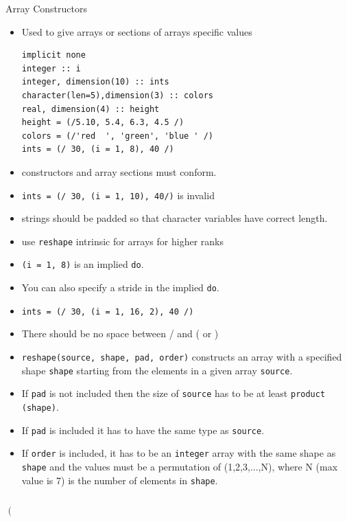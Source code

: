 \documentclass[c,mathserif,compress,xcolor=svgnames]{beamer}
\newcommand{\lstfortran}[1]{\lstinline[language={[90]Fortran},basicstyle=\footnotesize\ttfamily]|#1|}
\begin{document}
\begin{frame}{Array Constructors}
  \begin{itemize}
    \item Used to give arrays or sections of arrays specific values
      \begin{lstlisting}[language={[90]Fortran},basicstyle=\fontsize{6}{7}\selectfont\ttfamily]
implicit none
integer :: i
integer, dimension(10) :: ints
character(len=5),dimension(3) :: colors
real, dimension(4) :: height
height = (/5.10, 5.4, 6.3, 4.5 /)
colors = (/'red  ', 'green', 'blue ' /)
ints = (/ 30, (i = 1, 8), 40 /)
      \end{lstlisting}
    \item constructors and array sections must conform.
    \item[] \lstfortran{ints = (/ 30, (i = 1, 10), 40/)} is invalid
    \item strings should be padded so that character variables have correct length.
    \item use \lstfortran{reshape} intrinsic for arrays for higher ranks
    \item \lstfortran{(i = 1, 8)} is an implied \lstfortran{do}.
    \item You can also specify a stride in the implied \lstfortran{do}.
    \item[] \lstfortran{ints = (/ 30, (i = 1, 16, 2), 40 /)}
    \item {\color{red}There should be no space between / and ( or )}
      \framebreak
    \item \lstfortran{reshape(source, shape, pad, order)} constructs an array with a specified shape \lstfortran{shape} starting from the elements in a given array \lstfortran{source}.
    \item If \lstfortran{pad} is not included then the size of \lstfortran{source} has to be at least \lstfortran{product (shape)}. 
    \item If \lstfortran{pad} is included it has to have the same type as \lstfortran{source}. 
    \item If \lstfortran{order} is included, it has to be an \lstfortran{integer} array with the same shape as \lstfortran{shape} and the values must be a permutation of (1,2,3,...,N), where N (max value is 7) is the number of elements in \lstfortran{shape}.
  \end{itemize}
  \begin{columns}[t]
    \column{2cm}
    {\tiny
      \[ \left( \begin{array}{ccc}

\end{array}\]}
\end{columns}
\end{frame}
\end{document}

